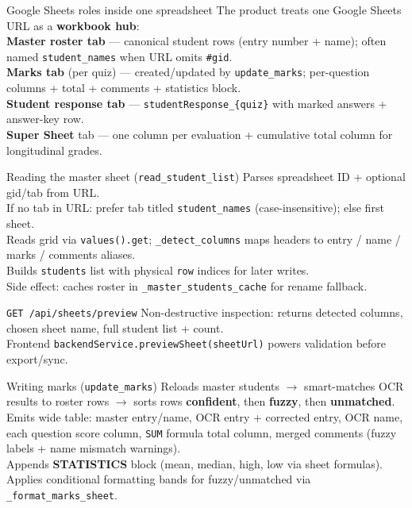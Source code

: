 \documentclass[aspectratio=169]{beamer}
\begin{document}
\begin{frame}{Google Sheets roles inside one spreadsheet}
  \small
  The product treats one Google Sheets URL as a \textbf{workbook hub}:\\[0.35em]
  \textbf{Master roster tab} --- canonical student rows (entry number + name); often named \texttt{student\_names} when URL omits \texttt{\#gid}.\\
  \textbf{Marks tab} (per quiz) --- created/updated by \texttt{update\_marks}; per-question columns + total + comments + statistics block.\\
  \textbf{Student response tab} --- \texttt{studentResponse\_\{quiz\}} with marked answers + answer-key row.\\
  \textbf{Super Sheet} tab --- one column per evaluation + cumulative total column for longitudinal grades.
\end{frame}

\begin{frame}{Reading the master sheet (\texttt{read\_student\_list})}
  \small
  Parses spreadsheet ID + optional gid/tab from URL.\\
  If no tab in URL: prefer tab titled \texttt{student\_names} (case-insensitive); else first sheet.\\
  Reads grid via \texttt{values().get}; \texttt{\_detect\_columns} maps headers to entry / name / marks / comments aliases.\\
  Builds \texttt{students} list with physical \texttt{row} indices for later writes.\\
  Side effect: caches roster in \texttt{\_master\_students\_cache} for rename fallback.
\end{frame}

\begin{frame}[fragile]{\texttt{GET /api/sheets/preview}}
  \small
  Non-destructive inspection: returns detected columns, chosen sheet name, full student list + count.\\
  Frontend \texttt{backendService.previewSheet(sheetUrl)} powers validation before export/sync.
\end{frame}

\begin{frame}{Writing marks (\texttt{update\_marks})}
  \tiny
  Reloads master students $\rightarrow$ smart-matches OCR results to roster rows $\rightarrow$ sorts rows \textbf{confident}, then \textbf{fuzzy}, then \textbf{unmatched}.\\
  Emits wide table: master entry/name, OCR entry + corrected entry, OCR name, each question score column, \texttt{SUM} formula total column, merged comments (fuzzy labels + name mismatch warnings).\\
  Appends \textbf{STATISTICS} block (mean, median, high, low via sheet formulas).\\
  Applies conditional formatting bands for fuzzy/unmatched via \texttt{\_format\_marks\_sheet}.
\end{frame}
\end{document}
